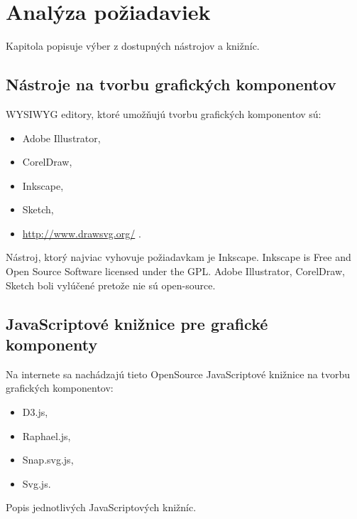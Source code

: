 \chapter{Analýza požiadaviek}
Kapitola popisuje výber z dostupných nástrojov a knižníc. 

\section{Nástroje na tvorbu grafických komponentov}

\acs{WYSIWYG} editory, ktoré umožňujú tvorbu grafických komponentov sú: 

\begin{itemize}
\item Adobe Illustrator, 
\item CorelDraw, 
\item Inkscape,
\item Sketch, 
\item \url{http://www.drawsvg.org/} .
\end{itemize}

Nástroj, ktorý najviac vyhovuje  požiadavkam je Inkscape. Inkscape is Free and Open Source Software licensed under the GPL.
Adobe Illustrator, CorelDraw, Sketch boli vylúčené pretože nie sú open-source.  




\section{JavaScriptové knižnice pre grafické komponenty}
Na internete sa nachádzajú tieto OpenSource JavaScriptové knižnice na tvorbu grafických komponentov: 
\begin{itemize}
	\item \acs{D3}.js, 
	\item Raphael.js, 
	\item Snap.svg.js,  
	\item Svg.js. 
\end{itemize}



Popis jednotlivých JavaScriptových knižníc.



